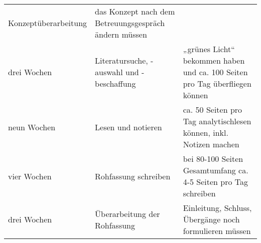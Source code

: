 \documentclass[]{article}
\begin{document}
\begin{longtable}[]{@{}lll@{}}
\begin{minipage}[t]{0.35\columnwidth}
Konzeptüberarbeitung\strut
\end{minipage} & \begin{minipage}[t]{0.41\columnwidth}\raggedright\strut
das Konzept nach dem Betreuungsgespräch ändern müssen\strut
\end{minipage}\tabularnewline
\begin{minipage}[t]{0.16\columnwidth}\raggedright\strut
drei Wochen\strut
\end{minipage} & \begin{minipage}[t]{0.35\columnwidth}\raggedright\strut
Literatursuche, -auswahl und -beschaffung\strut
\end{minipage} & \begin{minipage}[t]{0.41\columnwidth}\raggedright\strut
„grünes Licht`` bekommen haben und ca. 100 Seiten pro Tag überfliegen
können\strut
\end{minipage}\tabularnewline
\begin{minipage}[t]{0.16\columnwidth}\raggedright\strut
neun Wochen\strut
\end{minipage} & \begin{minipage}[t]{0.35\columnwidth}\raggedright\strut
Lesen und notieren\strut
\end{minipage} & \begin{minipage}[t]{0.41\columnwidth}\raggedright\strut
ca. 50 Seiten pro Tag analytischlesen können, inkl. Notizen machen\strut
\end{minipage}\tabularnewline
\begin{minipage}[t]{0.16\columnwidth}\raggedright\strut
vier Wochen\strut
\end{minipage} & \begin{minipage}[t]{0.35\columnwidth}\raggedright\strut
Rohfassung schreiben\strut
\end{minipage} & \begin{minipage}[t]{0.41\columnwidth}\raggedright\strut
bei 80-100 Seiten Gesamtumfang ca. 4-5 Seiten pro Tag schreiben\strut
\end{minipage}\tabularnewline
\begin{minipage}[t]{0.16\columnwidth}\raggedright\strut
drei Wochen\strut
\end{minipage} & \begin{minipage}[t]{0.35\columnwidth}\raggedright\strut
Überarbeitung der Rohfassung\strut
\end{minipage} & \begin{minipage}[t]{0.41\columnwidth}\raggedright\strut
Einleitung, Schluss, Übergänge noch formulieren müssen\strut

\end{minipage}
\end{longtable}
\end{document}
